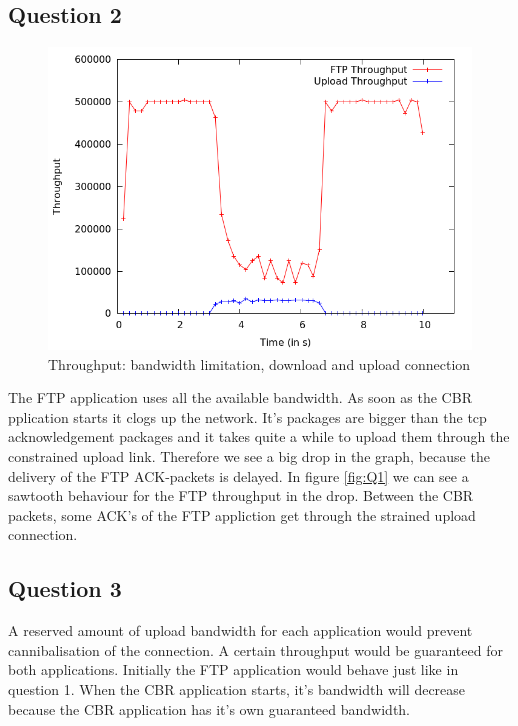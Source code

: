 \documentclass[11pt,a4paper]{article}
\begin{document}
\subsection{Question 2}
\begin{figure}[h!]
 \centering
 \includegraphics[width = 0.8\linewidth]{./output-ex1-part-2-1-7.png}
  \caption{Throughput: bandwidth limitation, download and upload connection}
 \label{fig:Q2}
\end{figure}
The FTP application uses all the available bandwidth. As soon as the CBR pplication starts it clogs up the network. It's packages are bigger than the tcp acknowledgement packages and it takes quite a while to upload them through the constrained upload link. Therefore we see a big drop in the graph, because the delivery of the FTP ACK-packets is delayed. In figure \ref{fig:Q1} we can see a sawtooth behaviour for the FTP throughput in the drop. Between the CBR packets, some ACK's of the FTP appliction get through the strained upload connection.

\subsection{Question 3}
A reserved amount of upload bandwidth for each application would prevent cannibalisation of the connection. A certain throughput would be guaranteed for both applications. Initially the FTP application would behave just like in question 1. When the CBR application starts, it's bandwidth will decrease because the CBR application has it's own guaranteed bandwidth.
\end{document}
